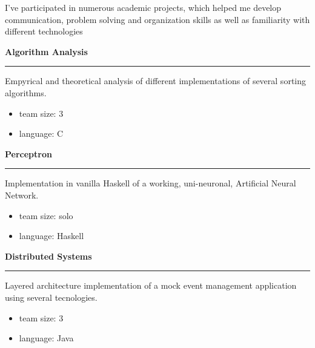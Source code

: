 \documentclass [10pt, a4paper] {extarticle}
\newcommand{\rightcolumwidth}{
    0.82
}
\begin{document}
    \begin {flushright}
    \begin {minipage} [t] {\rightcolumwidth\textwidth}
        I've participated in numerous academic projects, which helped me develop communication, problem solving and organization skills as well as familiarity with different technologies \\ [7px]
        \begin {minipage} [t] {0.3\textwidth}
            \textbf {Algorithm Analysis} \\ [-5px]
            \hrule
            \vspace {4px} Empyrical and theoretical analysis of different implementations of several sorting algorithms.
            \vspace {-4px}
            \begin {itemize} [noitemsep]
            \item team size: 3
            \item language: C
            \end {itemize}
        \end {minipage}
        \hfill
        \begin {minipage} [t] {0.3\textwidth}
            \textbf {Perceptron} \\ [-5px]
            \hrule
            \vspace {4px} Implementation in vanilla Haskell of a working, uni-neuronal, Artificial Neural Network.
            \vspace {-4px}
            \begin {itemize} [noitemsep]
                \item team size: solo
                \item language: Haskell
            \end {itemize}
        \end {minipage}
        \hfill
        \begin {minipage} [t] {0.3\textwidth}
            \textbf {Distributed Systems} \\ [-5px]
            \hrule
            \vspace {4px} Layered architecture implementation of a mock event management application using several tecnologies.
            \vspace {-4px}
            \begin {itemize} [noitemsep]
                \item team size: 3
                \item language: Java
            \end {itemize}
        \end {minipage}
    \end {minipage}
    \end {flushright}
\end{document}
